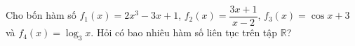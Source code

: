 \begin{ex}
Cho bốn hàm số $f_1(x)=2x^3-3x+1$, $f_2(x)=\dfrac{3x+1}{x-2}$, $f_3(x)=\cos x+3$ và $f_4(x)=\log_3x$. Hỏi có bao nhiêu hàm số liên tục trên tập $\mathbb R$?
\end{ex}
